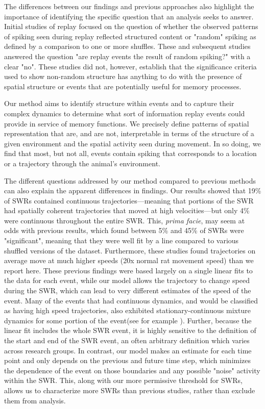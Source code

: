 \documentclass[9pt,lineno]{elife}
\begin{document}
The differences between our findings and previous approaches also highlight the importance of identifying the specific question that an analysis seeks to answer. Initial studies of replay \citep{LeeMemorySequentialExperience2002, FosterReversereplaybehavioural2006, DavidsonHippocampalReplayExtended2009, KarlssonAwakereplayremote2009} focused on the question of whether the observed patterns of spiking seen during replay reflected structured content or "random" spiking as defined by a comparison to one or more shuffles. These and subsequent studies answered the question "are replay events the result of random spiking?" with a clear "no". These studies did not, however, establish that the significance criteria used to show non-random structure has anything to do with the presence of spatial structure or events that are potentially useful for memory processes.

Our method aims to identify structure within events and to capture their complex dynamics to determine what sort of information replay events could provide in service of memory functions. We precisely define patterns of spatial representation that are, and are not, interpretable in terms of the structure of a given environment and the spatial activity seen during movement. In so doing, we find that most, but not all, events contain spiking that corresponds to a location or a trajectory through the animal's environment. 

The different questions addressed by our method compared to previous methods can also explain the apparent differences in findings. Our results showed that 19\% of SWRs contained continuous trajectories---meaning that portions of the SWR had spatially coherent trajectories that moved at high velocities---but only 4\% were continuous throughout the entire SWR. This, \textit{prima facie}, may seem at odds with previous results, which found between 5\% and 45\% of SWRs were "significant", meaning that they were well fit by a line compared to various shuffled versions of the dataset. Furthermore, these studies found trajectories on average move at much higher speeds (20x normal rat movement speed) than we report here. These previous findings were based largely on a single linear fits to the data for each event, while our model allows the trajectory to change speed during the SWR, which can lead to very different estimates of the speed of the event. Many of the events that had continuous dynamics, and would be classified as having high speed trajectories, also exhibited stationary-continuous mixture dynamics for some portion of the event(see for example ). Further, because the linear fit includes the whole SWR event, it is highly sensitive to the definition of the start and end of the SWR event, an often arbitrary definition which varies across research groups. In contrast, our model makes an estimate for each time point and only depends on the previous and future time step, which minimizes the dependence of the event on those boundaries and any possible "noise" activity within the SWR. This, along with our more permissive threshold for SWRs, allows us to characterize more SWRs than previous studies, rather than exclude them from analysis.
\end{document}
